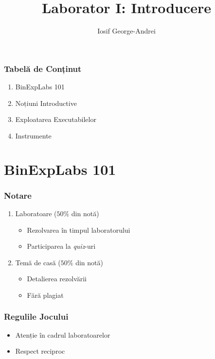 \documentclass[xcolor={table}]{beamer}
\title{Laborator I: Introducere}
\subtitle{}
\author{Iosif George-Andrei}
\begin{document}
    \setcounter{showProgressBar}{0}
	\setcounter{showSlideNumbers}{0}
	\frame{\titlepage}

	\begin{frame}
		\frametitle{Tabelă de Conținut}\pause
		\begin{enumerate}[<+->]
			\item BinExpLabs 101
			\item Noțiuni Introductive
			\item Exploatarea Executabilelor
			\item Instrumente
		\end{enumerate}
	\end{frame}

	\setcounter{framenumber}{0}
	\setcounter{showProgressBar}{1}
	\setcounter{showSlideNumbers}{1}
	\section{BinExpLabs 101}

	\begin{frame}
		\frametitle{Notare}\pause
		\begin{enumerate}[<+->]
			\item Laboratoare ($ 50\% $ din notă)
			    \begin{itemize}
			        \item Rezolvarea în timpul laboratorului
			        \item Participarea la \textit{quiz}-uri
			    \end{itemize}
			\item Temă de casă ($ 50\% $ din notă)
			    \begin{itemize}
			        \item Detalierea rezolvării
			        \item Fără plagiat
			    \end{itemize}
		\end{enumerate}
	\end{frame}
	
	\begin{frame}
		\frametitle{Regulile Jocului}\pause
		\begin{itemize}[<+->]
			\item Atenție în cadrul laboratoarelor
			\item Respect reciproc
		\end{itemize}
	\end{frame}
	
\end{document}
